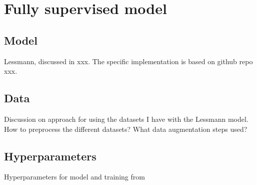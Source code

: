 \section{Fully supervised model}

\subsection{Model}

Lessmann, discussed in xxx.
The specific implementation is based on github repo xxx.

\subsection{Data}

Discussion on approach for using the datasets I have with the Lessmann model.
How to preprocess the different datasets?
What data augmentation steps used?

\subsection{Hyperparameters}

Hyperparameters for model and training from \cite{Lessmann2018}